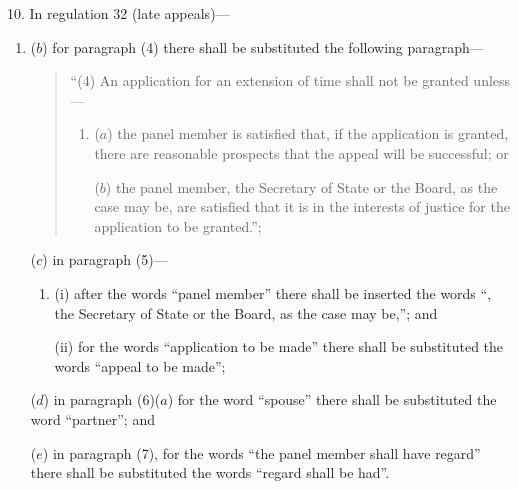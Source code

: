 \documentclass[12pt,a4paper]{article}
\begin{document}
10.  In regulation 32 (late appeals)—
\begin{enumerate}\item[]

($b$) for paragraph (4) there shall be substituted the following paragraph—
\begin{quotation}
“(4) An application for an extension of time shall not be granted unless—
\begin{enumerate}\item[]
($a$) the panel member is satisfied that, if the application is granted, there are reasonable prospects that the appeal will be successful; or

($b$) the panel member, the Secretary of State or the Board, as the case may be, are satisfied that it is in the interests of justice for the application to be granted.”;
\end{enumerate}
\end{quotation}

($c$) in paragraph (5)—
\begin{enumerate}\item[]
(i) after the words “panel member” there shall be inserted the words “, the Secretary of State or the Board, as the case may be,”; and

(ii) for the words “application to be made” there shall be substituted the words “appeal to be made”;
\end{enumerate}

($d$) in paragraph (6)($a$)  for the word “spouse” there shall be substituted the word “partner”; and

($e$) in paragraph (7), for the words “the panel member shall have regard” there shall be substituted the words “regard shall be had”.
\end{enumerate}


\medskip
\end{document}

